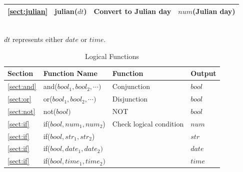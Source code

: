 \begin{table}[!hb]
\begin{center}
{\begin{tabular}{l|l|l|l}



\ref{sect:julian}& julian($dt$)&
Convert to Julian day&$num$(Julian day)\\




\hline
  \end{tabular}
	\\$dt$ represents either $date$ or $time$.
  }
  \end{center}
\end{table}

\begin{table}[!hb]
\begin{center}
\caption{Logical Functions\label{tbl:mcal_logical}}
{\small
  \begin{tabular}{l|l|l|l} \hline
Section&Function Name&Function&Output\\ \hline

\ref{sect:and}& and($bool_1,bool_2,\cdots)$& Conjunction&$bool$\\
\ref{sect:or}& or($bool_1,bool_2,\cdots)$  & Disjunction &$bool$\\
\ref{sect:not}& not($bool)$                & NOT   &$bool$\\
\hline
\ref{sect:if}& if($bool,num_1,num_2$)      &Check logical condition& $num$\\
\ref{sect:if}& if($bool,str_1,str_2$)      &        & $str$\\
\ref{sect:if}& if($bool,date_1,date_2)$    &        & $date$\\
\ref{sect:if}& if($bool,time_1,time_2)$    &        & $time$\\

\hline
  \end{tabular}
  }
  \end{center}
\end{table}

